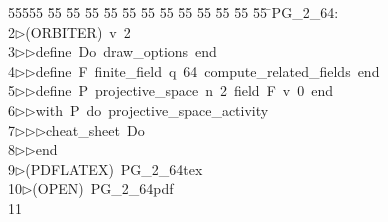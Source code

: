 %
%
\begin{tabbing}
55555 \= 55 \= 55 \= 55 \= 55 \= 55 \= 55 \= 55 \= 55 \= 55 \= 55 \= 55 \= 55 \= \>PG\_2\_64:\\[0pt]
2\>$\triangleright$\>(ORBITER)\ v\ 2\ \\[0pt]
3\>$\triangleright$\>$\triangleright$\>define\ Do\ draw\_options\ end\ \\[0pt]
4\>$\triangleright$\>$\triangleright$\>define\ F\ finite\_field\ q\ 64\ compute\_related\_fields\ end\ \\[0pt]
5\>$\triangleright$\>$\triangleright$\>define\ P\ projective\_space\ n\ 2\ field\ F\ v\ 0\ end\ \\[0pt]
6\>$\triangleright$\>$\triangleright$\>with\ P\ do\ projective\_space\_activity\ \\[0pt]
7\>$\triangleright$\>$\triangleright$\>$\triangleright$\>cheat\_sheet\ Do\ \\[0pt]
8\>$\triangleright$\>$\triangleright$\>end\\[0pt]
9\>$\triangleright$\>(PDFLATEX)\ PG\_2\_64tex\ \\[0pt]
10\>$\triangleright$\>(OPEN)\ PG\_2\_64pdf\\[0pt]
11\>\end{tabbing}
